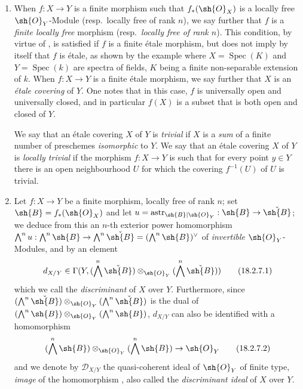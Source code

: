 \begin{remarks}[18.2.7]
\label{IV.18.2.7}
\begin{enumerate}
  \item[(i)] When $f:X\to Y$ is a finite morphism such that $f_*(\sh{O}_X)$ is a locally free $\sh{O}_Y$-Module (resp.\ locally free of rank $n$), we say further that $f$ is a \emph{finite locally free} morphism (resp.\ \emph{locally free of rank $n$}).
This condition, by virtue of , is satisfied if $f$ is a finite \'etale morphism, but does not imply by itself that $f$ is \'etale, as shown by the example where $X=\operatorname{Spec}(K)$ and $Y=\operatorname{Spec}(k)$ are spectra of fields, $K$ being a finite non-separable extension of $k$.
When $f:X\to Y$ is a finite \'etale morphism, we say further that $X$ is an \emph{\'etale covering} of $Y$.
One notes that in this case, $f$ is universally open and universally closed, and in particular $f(X)$ is a subset that is both open and closed of $Y$.

We say that an \'etale covering $X$ of $Y$ is \emph{trivial} if $X$ is a \emph{sum} of a finite number of preschemes \emph{isomorphic} to $Y$.
We say that an \'etale covering $X$ of $Y$ is \emph{locally trivial} if the morphism $f:X\to Y$ is such that for every point $y\in Y$ there is an open neighbourhood $U$ for which the covering $f^{-1}(U)$ of $U$ is trivial.

  \item[(ii)] Let $f:X\to Y$ be a finite morphism, locally free of rank $n$;
set $\sh{B}=f_*(\sh{O}_X)$ and let $u=\operatorname{astr}_{\sh{B}|\sh{O}_Y}:\sh{B}\to\check{\sh{B}}$;
we deduce from this an $n$-th exterior power homomorphism
$\bigwedge^n u:\bigwedge^n\sh{B}\to\bigwedge^n\check{\sh{B}}=(\bigwedge^n\sh{B})^\vee$ of \emph{invertible} $\sh{O}_Y$-Modules, and by  an element
\[
\label{IV.18.2.7.1}
d_{X/Y}\in\Gamma(Y,(\bigwedge^n\check{\sh{B}})\otimes_{\sh{O}_Y}(\bigwedge^n\check{\sh{B}}))
\tag{18.2.7.1}
\]
which we call the \emph{discriminant} of $X$ over $Y$.
Furthermore, since $(\bigwedge^n\check{\sh{B}})\otimes_{\sh{O}_Y}(\bigwedge^n\check{\sh{B}})$ is the dual of $(\bigwedge^n\sh{B})\otimes_{\sh{O}_Y}(\bigwedge^n\sh{B})$, $d_{X/Y}$ can also be identified with a homomorphism
\[
\label{IV.18.2.7.2}
(\bigwedge^n\sh{B})\otimes_{\sh{O}_Y}(\bigwedge^n\sh{B})\to\sh{O}_Y
\tag{18.2.7.2}
\]
and we denote by $\mathscr{D}_{X/Y}$ the quasi-coherent ideal of $\sh{O}_Y$ of finite type, \emph{image} of the homomorphism , also called the \emph{discriminant ideal} of $X$ over $Y$.
\end{enumerate}
\end{remarks}

